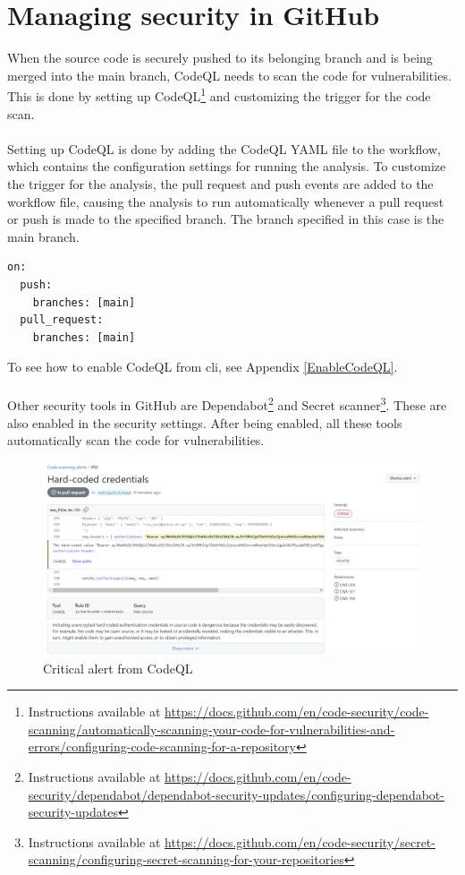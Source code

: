 \section{Managing security in GitHub}
When the source code is securely pushed to its belonging branch and is being merged into the main branch, CodeQL needs to scan the code for vulnerabilities. This is done by setting up CodeQL\footnote{Instructions available at \url{https://docs.github.com/en/code-security/code-scanning/automatically-scanning-your-code-for-vulnerabilities-and-errors/configuring-code-scanning-for-a-repository}} and customizing the trigger for the code scan. 
\\~\\
Setting up CodeQL is done by adding the CodeQL YAML file to the workflow, which contains the configuration settings for running the analysis. To customize the trigger for the analysis, the pull request and push events are added to the workflow file, causing the analysis to run automatically whenever a pull request or push is made to the specified branch. The branch specified in this case is the main branch. \cite{CodeQLCustom} 

\begin{tcolorbox}
\begin{verbatim}
on:
  push:
    branches: [main]
  pull_request:
    branches: [main]
\end{verbatim}
\end{tcolorbox}
To see how to enable CodeQL from \acrshort{cli}, see Appendix \ref{EnableCodeQL}.
\\~\\
 Other security tools in GitHub are Dependabot\footnote{Instructions available at \url{https://docs.github.com/en/code-security/dependabot/dependabot-security-updates/configuring-dependabot-security-updates}} and Secret scanner\footnote{Instructions available at \url{https://docs.github.com/en/code-security/secret-scanning/configuring-secret-scanning-for-your-repositories}}. These are also enabled in the security settings. After being enabled, all these tools automatically scan the code for vulnerabilities.

\begin{figure}[H]
    \centering
    \includegraphics[width=0.8\columnwidth]{Images/codescan.png}
    \caption{Critical alert from CodeQL}
    \label{fig: Critical alert CodeQL}
\end{figure}

